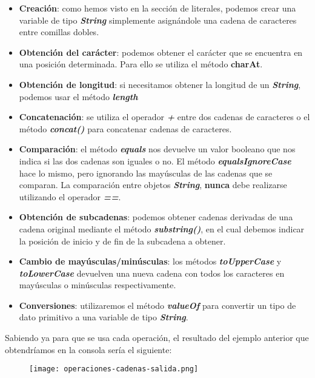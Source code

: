 \begin{itemize}
    \item \textbf{Creación}: como hemos visto en la sección de literales, podemos crear una variable de tipo \textbf{\textit{String}} simplemente asignándole una cadena de caracteres entre comillas dobles.
    \item \textbf{Obtención del carácter}: podemos obtener el carácter que se encuentra en una posición determinada. Para ello se utiliza el método \textbf{charAt}.
    \item \textbf{Obtención de longitud}: si necesitamos obtener la longitud de un \textbf{\textit{String}}, podemos usar el método \textbf{\textit{length}}
    \item \textbf{Concatenación}: se utiliza el operador \textbf{\textit{+}} entre dos cadenas de caracteres o el método \textbf{\textit{concat()}} para concatenar cadenas de caracteres.
    \item \textbf{Comparación}: el método \textbf{\textit{equals}} nos devuelve un valor booleano que nos indica si las dos cadenas son iguales o no. El método \textbf{\textit{equalsIgnoreCase}} hace lo mismo, pero ignorando las mayúsculas de las cadenas que se comparan. La comparación entre objetos \textbf{\textit{String}}, \textbf{nunca} debe realizarse utilizando el operador \textbf{\textit{==}}.
    \item \textbf{Obtención de subcadenas}: podemos obtener cadenas derivadas de una cadena original mediante el método \textbf{\textit{substring()}}, en el cual debemos indicar la posición de inicio y de fin de la subcadena a obtener.
    \item \textbf{Cambio de mayúsculas/minúsculas}: los métodos \textbf{\textit{toUpperCase}} y \textbf{\textit{toLowerCase}} devuelven una nueva cadena con todos los caracteres en mayúsculas o minúsculas respectivamente.
    \item \textbf{Conversiones}: utilizaremos el método \textbf{\textit{valueOf}} para convertir un tipo de dato primitivo a una variable de tipo \textbf{\textit{String}}.
\end{itemize}

Sabiendo ya para que se usa cada operación, el resultado del ejemplo anterior que obtendríamos en la consola sería el siguiente:

\begin{figure}[H]
    \centering
    \texttt{[image: operaciones-cadenas-salida.png]}
\end{figure}

